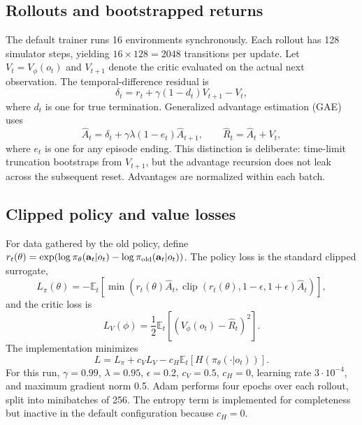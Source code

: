 \documentclass[10pt]{article}
\newcommand{\E}{\mathbb{E}}
\begin{document}
\subsection{Rollouts and bootstrapped returns}
The default trainer runs 16 environments synchronously. Each rollout has 128
simulator steps, yielding $16\times128=2048$ transitions per update. Let
$V_t=V_\phi(o_t)$ and $V_{t+1}$ denote the critic evaluated on the actual next
observation. The temporal-difference residual is
\begin{equation}
 \delta_t=r_t+\gamma(1-d_t)V_{t+1}-V_t,
\end{equation}
where $d_t$ is one for true termination. Generalized advantage estimation (GAE)
uses
\begin{equation}
 \hat A_t=\delta_t+\gamma\lambda(1-e_t)\hat A_{t+1},
 \qquad \hat R_t=\hat A_t+V_t,
\end{equation}
where $e_t$ is one for any episode ending. This distinction is deliberate:
time-limit truncation bootstraps from $V_{t+1}$, but the advantage recursion does
not leak across the subsequent reset. Advantages are normalized within each batch.

\subsection{Clipped policy and value losses}
For data gathered by the old policy, define
$r_t(\theta)=\exp(\log\pi_\theta(\mathbf{a}_t|o_t)-\log\pi_{\rm old}(\mathbf{a}_t|o_t))$.
The policy loss is the standard clipped surrogate,
\begin{equation}
 L_\pi(\theta)=-\E_t\left[\min\left(r_t(\theta)\hat A_t,
 \operatorname{clip}(r_t(\theta),1-\epsilon,1+\epsilon)\hat A_t\right)\right],
\end{equation}
and the critic loss is
\begin{equation}
 L_V(\phi)=\frac12\E_t[(V_\phi(o_t)-\hat R_t)^2].
\end{equation}
The implementation minimizes
\begin{equation}
 L=L_\pi+c_VL_V-c_H\E_t[H(\pi_\theta(\cdot|o_t))].
\end{equation}
For this run, $\gamma=0.99$, $\lambda=0.95$, $\epsilon=0.2$,
$c_V=0.5$, $c_H=0$, learning rate $3\cdot10^{-4}$, and maximum gradient norm
0.5. Adam performs four epochs over each rollout, split into minibatches of 256.
The entropy term is implemented for completeness but inactive in the default
configuration because $c_H=0$.
\end{document}
